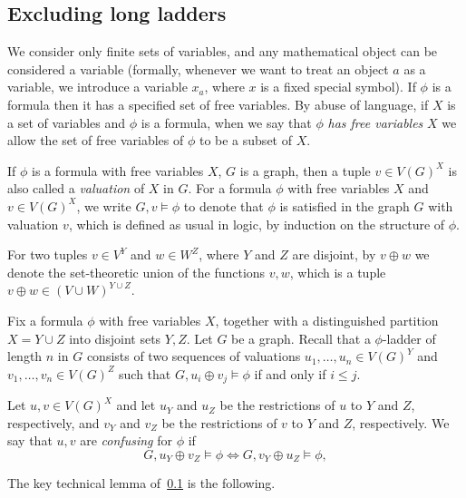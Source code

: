 \subsection{Excluding long ladders}
\label{sec:uqw-stable}


\newcommand{\rg}{\mathrm{rg}}
\newcommand{\fv}{\mathrm{fv}}
\newcommand{\from}{\colon}
We consider only finite sets of variables, and any mathematical object can be considered a variable (formally, whenever we want to treat an object $a$ as a variable, we  introduce a variable $x_a$, where $x$ is a fixed special symbol).
If $\phi$ is a formula then it has a specified set of free variables.
By abuse of language, if $X$ is a set of variables and $\phi$
is a formula, when we say that $\phi$ \emph{has free variables} $X$
we allow the set of free variables of $\phi$ to be a subset of $X$.

If $\phi$ is a formula with free variables $X$, $G$
is a  graph, then a tuple $v\in V(G)^X$ is also called a \emph{valuation} of $X$ in $G$.
For a formula $\phi$ with free variables $X$ and $v\in V(G)^X$, we write $G,v\models \phi$ to denote that $\phi$ is satisfied 
in the graph $G$ with valuation $v$, which is defined as usual in logic, by induction on the structure of $\phi$.

For two tuples
$v\in V^Y$ and $w\in  W^Z$, where $Y$ and $Z$ are disjoint, by
$v\oplus w$ we denote the set-theoretic union of the functions $v,w$,
which is a tuple $v\oplus w\in (V\cup W)^{Y\cup Z}$.

	 	Fix a formula $\phi$ with free variables $X$, together with a distinguished partition $X=Y\cup Z$ into disjoint sets $Y,Z$.
		Let $G$ be a graph.
    Recall that a $\phi$-ladder of length $n$ in $G$ consists of two sequences of valuations $u_1,\ldots,u_n\in V(G)^Y$
    and $v_1,\ldots,v_n\in V(G)^Z$
     such that $G,u_i\oplus v_j\models \phi$ if and only if $i\le j$.
    
    
    
		Let $u,v\in V(G)^X$ 
		and let $u_Y$ and $u_Z$ be the restrictions of $u$ to $Y$ and $Z$, respectively,
and $v_Y$ and $v_Z$ be the restrictions of $v$ to $Y$ and $Z$, respectively.
		We say that $u,v$ are \emph{confusing} for $\phi$
		if $$G,u_Y\oplus v_Z\models \phi\iff G,v_Y\oplus u_Z\models \phi,$$
		



\medskip
The key technical lemma of~\cref{sec:uqw-stable} is the following.

